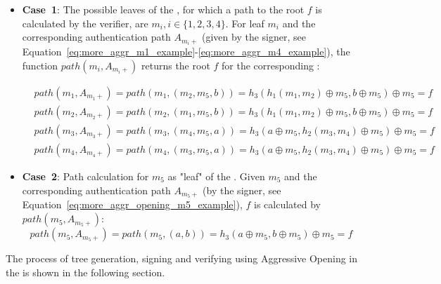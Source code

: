 \begin{itemize}
\item \textbf{Case~1}: The possible leaves of the \tfblock, for which a path to the root $f$ is calculated by the verifier, are $m_i, i \in \{1,2,3,4\}$. For leaf $m_i$ and the corresponding authentication path $A_{m_i+}$ (given by the signer, see Equation~\ref{eq:more_aggr_m1_example}-\ref{eq:more_aggr_m4_example}), the function $path(m_i,A_{m_i+})$ returns the root $f$ for the corresponding \tfblock:

\begin{align}
&path(m_1, A_{m_1+}) = path(m_1, (m_2, m_5, b)) = h_3(h_1(m_1, m_2) \oplus m_5, b \oplus m_5) \oplus m_5 = f \label{eq:more_aggr_path_m1}\\
&path(m_2, A_{m_2+}) = path(m_2, (m_1, m_5, b)) = h_3(h_1(m_1, m_2) \oplus m_5, b \oplus m_5) \oplus m_5 = f\\
&path(m_3, A_{m_3+}) = path(m_3, (m_4, m_5, a)) = h_3(a \oplus m_5, h_2(m_3, m_4) \oplus m_5) \oplus m_5 = f \\
&path(m_4, A_{m_4+}) = path(m_4, (m_3, m_5, a)) = h_3(a \oplus m_5, h_2(m_3, m_4) \oplus m_5) \oplus m_5 = f \label{eq:more_aggr_path_m4}
\end{align}

\item \textbf{Case~2}: Path calculation for $m_5$ as "leaf" of the \tfblock. Given $m_5$ and the corresponding authentication path $A_{m_5+}$ (by the signer, see Equation~\ref{eq:more_aggr_opening_m5_example}), $f$ is calculated by $path(m_5, A_{m_5+})$:
\begin{equation}
\label{eq:more_aggr_path_m5}
path(m_5, A_{m_5+}) =  path(m_5, (a,b)) = h_3(a \oplus m_5, b \oplus m_5) \oplus m_5 = f
\end{equation}
\end{itemize}
The process of tree generation, signing and verifying using Aggressive Opening in the \extree is shown in the following section. 


